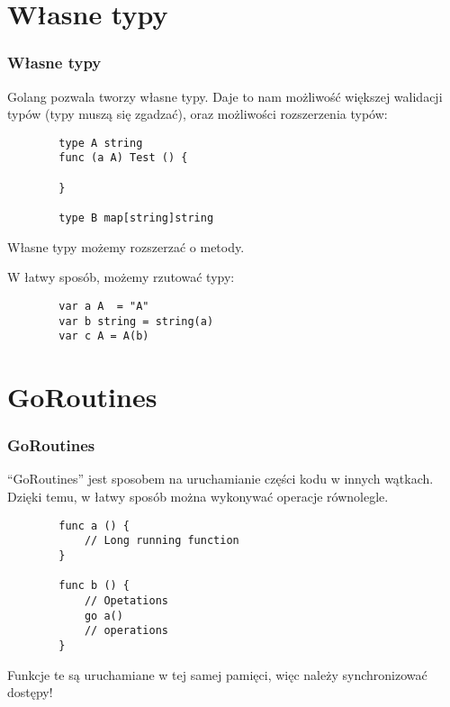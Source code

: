 \documentclass[10pt]{beamer}
\newcommand{\quotes}[1]{``#1''}
\begin{document}
\section[Własne typy]{Własne typy}
\begin{frame}[fragile]
    \frametitle{Własne typy}
    Golang pozwala tworzy własne typy. Daje to nam możliwość większej
    walidacji typów (typy muszą się zgadzać), oraz możliwości rozszerzenia typów:

    \begin{verbatim}
        type A string
        func (a A) Test () {

        }

        type B map[string]string
    \end{verbatim}

    Własne typy możemy rozszerzać o metody.
    
    W łatwy sposób, możemy rzutować typy:

    \begin{verbatim}
        var a A  = "A"
        var b string = string(a)
        var c A = A(b)
    \end{verbatim}
\end{frame}

\section[GoRoutines]{GoRoutines}
\begin{frame}[fragile]
    \frametitle{GoRoutines}
    \quotes{GoRoutines} jest sposobem na uruchamianie części kodu w innych wątkach.
    Dzięki temu, w łatwy sposób można wykonywać operacje równolegle.

    \begin{verbatim}
        func a () {
            // Long running function
        }

        func b () {
            // Opetations
            go a()
            // operations
        }
    \end{verbatim}

    Funkcje te są uruchamiane w tej samej pamięci, więc należy synchronizować dostępy!
\end{frame}
\end{document}

